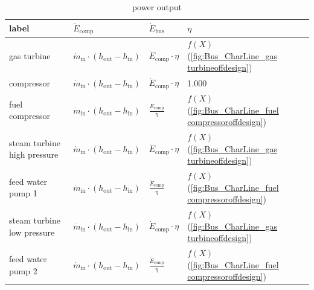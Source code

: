 \begin{table}[H]\begin{center}
\begin{tabular}{llll}
\toprule
                       label &                                                   $\dot{E}_\mathrm{comp}$ &                $\dot{E}_\mathrm{bus}$ &                                                               $\eta$ \\
\midrule
                 gas turbine &  $\dot{m}_\mathrm{in} \cdot \left(h_\mathrm{out} - h_\mathrm{in} \right)$ &    $\dot{E}_\mathrm{comp} \cdot \eta$ &      $f\left(X\right)$ (\ref{fig:Bus_CharLine_gas turbineoffdesign}) \\
                  compressor &  $\dot{m}_\mathrm{in} \cdot \left(h_\mathrm{out} - h_\mathrm{in} \right)$ &    $\dot{E}_\mathrm{comp} \cdot \eta$ &                                                                1.000 \\
             fuel compressor &  $\dot{m}_\mathrm{in} \cdot \left(h_\mathrm{out} - h_\mathrm{in} \right)$ &  $\frac{\dot{E}_\mathrm{comp}}{\eta}$ &  $f\left(X\right)$ (\ref{fig:Bus_CharLine_fuel compressoroffdesign}) \\
 steam turbine high pressure &  $\dot{m}_\mathrm{in} \cdot \left(h_\mathrm{out} - h_\mathrm{in} \right)$ &    $\dot{E}_\mathrm{comp} \cdot \eta$ &      $f\left(X\right)$ (\ref{fig:Bus_CharLine_gas turbineoffdesign}) \\
           feed water pump 1 &  $\dot{m}_\mathrm{in} \cdot \left(h_\mathrm{out} - h_\mathrm{in} \right)$ &  $\frac{\dot{E}_\mathrm{comp}}{\eta}$ &  $f\left(X\right)$ (\ref{fig:Bus_CharLine_fuel compressoroffdesign}) \\
  steam turbine low pressure &  $\dot{m}_\mathrm{in} \cdot \left(h_\mathrm{out} - h_\mathrm{in} \right)$ &    $\dot{E}_\mathrm{comp} \cdot \eta$ &      $f\left(X\right)$ (\ref{fig:Bus_CharLine_gas turbineoffdesign}) \\
           feed water pump 2 &  $\dot{m}_\mathrm{in} \cdot \left(h_\mathrm{out} - h_\mathrm{in} \right)$ &  $\frac{\dot{E}_\mathrm{comp}}{\eta}$ &  $f\left(X\right)$ (\ref{fig:Bus_CharLine_fuel compressoroffdesign}) \\
\bottomrule
\end{tabular}
\caption{power output}
\end{center}\end{table}



